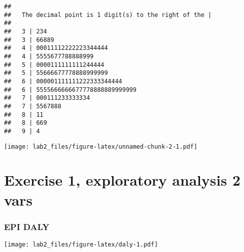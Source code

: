 \documentclass[
]{article}
\newenvironment{Shaded}{\begin{snugshade}}{\end{snugshade}}
\newcommand{\CommentTok}[1]{\textcolor[rgb]{0.56,0.35,0.01}{\textit{#1}}}
\newcommand{\DataTypeTok}[1]{\textcolor[rgb]{0.13,0.29,0.53}{#1}}
\newcommand{\KeywordTok}[1]{\textcolor[rgb]{0.13,0.29,0.53}{\textbf{#1}}}
\newcommand{\NormalTok}[1]{#1}
\newcommand{\OperatorTok}[1]{\textcolor[rgb]{0.81,0.36,0.00}{\textbf{#1}}}
\newcommand{\StringTok}[1]{\textcolor[rgb]{0.31,0.60,0.02}{#1}}
\begin{document}
\begin{Shaded}
\end{Shaded}

\begin{verbatim}
## 
##   The decimal point is 1 digit(s) to the right of the |
## 
##   3 | 234
##   3 | 66889
##   4 | 00011112222223344444
##   4 | 5555677788888999
##   5 | 0000111111111244444
##   5 | 55666677778888999999
##   6 | 000001111111222333344444
##   6 | 5555666666677778888889999999
##   7 | 000111233333334
##   7 | 5567888
##   8 | 11
##   8 | 669
##   9 | 4
\end{verbatim}

\begin{Shaded}
\end{Shaded}

\texttt{[image: lab2\_files/figure-latex/unnamed-chunk-2-1.pdf]}

\hypertarget{exercise-1-exploratory-analysis-2-vars}{%
\section{Exercise 1, exploratory analysis 2
vars}\label{exercise-1-exploratory-analysis-2-vars}}

\hypertarget{epi-daly}{%
\subsubsection{EPI DALY}\label{epi-daly}}

\begin{Shaded}
\end{Shaded}

\texttt{[image: lab2\_files/figure-latex/daly-1.pdf]}

\begin{Shaded}
\end{Shaded}
\end{document}
